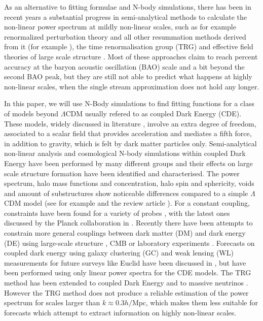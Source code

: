 As an alternative to fitting formulae and N-body simulations, there
has been in recent years a substantial progress in semi-analytical
methods to calculate the non-linear power spectrum at mildly non-linear
scales, such as for example renormalized perturbation theory \citep{crocce_renormalized_2006}
and all other resummation methods derived from it (for example \cite{Anselmi2012}),
the time renormalisation group (TRG) \citep{Pietroni_2008} and effective
field theories of large scale structure \cite{baumann_cosmological_2010}.
Most of these approaches claim to reach percent accuracy at the baryon
acoustic oscillation (BAO) scale and a bit beyond the second BAO peak,
but they are still not able to predict what happens at highly non-linear
scales, when the single stream approximation does not hold any longer.

In this paper, we will use N-Body simulations to find fitting functions
for a class of models beyond $\Lambda$CDM usually refered to as coupled
Dark Energy (CDE). These models, widely discussed in literature \citep{Wetterich_1995, Amendola_2000,Amendola_2004,pettorino_baccigalupi_2008},
involve an extra degree of freedom, associated to a scalar field that
provides acceleration and mediates a fifth force, in addition to gravity,
which is felt by dark matter particles only. Semi-analytical non-linear
analysis \cite{wintergerst_clarifying_2010,Saracco_etal_2010} and
cosmological N-body simulations within coupled Dark Energy have been
performed by many different groups \citep{baldi_etal_2010,Li_Barrow_2011,maccio_coupled_2004,carlesi_hydrodynamical_2014-1,baldi_codecs_2012,2015arXiv150407243P}
and their effects on large scale structure formation have been identified
and characterised. The power spectrum, halo mass functions and concentration,
halo spin and sphericity, voids and amount of substructures show noticeable
differences compared to a simple $\Lambda$CDM model (see for example
\citep{mainini_mass_2006,maccio_concentration_2008,baldi_clarifying_2011,cui_halo_2012,baldi_effect_2011,sutter_observability_2014}
and the review article \citep{Baldi_2012b}). For a constant coupling,
constraints have been found for a variety of probes \citep{pettorino_constraints_2012,pettorino_testing_2013,amendola_skewness_2004,Xia_2009},
with the latest ones discussed by the Planck collaboration in \citep{planckcollaboration_planck2015_2015}.
Recently there have been attempts to constrain more general couplings
between dark matter (DM) and dark energy (DE) using large-scale structure
\citep{creminelli_single-field_2014}, CMB \citep{morris_cosmicmicrowave_2014}
or laboratory experiments \citep{hamilton_atominterferometry_2015}.
Forecasts on coupled dark energy using galaxy clustering (GC) and
weak lensing (WL) measurements for future surveys like Euclid have
been discussed in \citep{amendola2012testing}, but have been performed
using only linear power spectra for the CDE models. The TRG method
has been extended to coupled Dark Energy \citep{saracco_non-linear_2010}
and to massive neutrinos \citep{lesgourgues_non-linear_2009}. However
the TRG method does not produce a reliable estimation of the power
spectrum for scales larger than $k\approx0.3h/\mbox{Mpc}$, which
makes them less suitable for forecasts which attempt to extract information
on highly non-linear scales.

